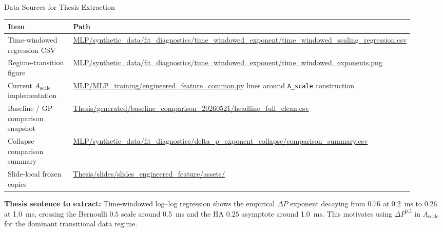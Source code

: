 \documentclass[UTF8,aspectratio=169]{ctexbeamer}
\begin{document}
\begin{frame}{Data Sources for Thesis Extraction}
\small
\begin{tabular}{L{0.28\linewidth}L{0.64\linewidth}}
\toprule
Item & Path \\
\midrule
Time-windowed regression CSV &
\scriptsize\url{MLP/synthetic_data/fit_diagnostics/time_windowed_exponent/time_windowed_scaling_regression.csv} \\
Regime-transition figure &
\scriptsize\url{MLP/synthetic_data/fit_diagnostics/time_windowed_exponent/time_windowed_exponents.png} \\
Current \(A_{\mathrm{scale}}\) implementation &
\scriptsize\url{MLP/MLP_training/engineered_feature_common.py} lines around \texttt{A\_scale} construction \\
Baseline / GP comparison snapshot &
\scriptsize\url{Thesis/generated/baseline_comparison_20260521/headline_full_clean.csv} \\
Collapse comparison summary &
\scriptsize\url{MLP/synthetic_data/fit_diagnostics/delta_p_exponent_collapse/comparison_summary.csv} \\
Slide-local frozen copies &
\scriptsize\url{Thesis/slides/slides_engineered_feature/assets/} \\
\bottomrule
\end{tabular}

\vspace{0.6em}
\textbf{Thesis sentence to extract:} Time-windowed log--log regression shows the empirical \(\Delta P\) exponent decaying from 0.76 at \SI{0.2}{ms} to 0.26 at \SI{1.0}{ms}, crossing the Bernoulli \(0.5\) scale around \SI{0.5}{ms} and the HA \(0.25\) asymptote around \SI{1.0}{ms}. This motivates using \(\Delta P^{0.5}\) in \(A_{\mathrm{scale}}\) for the dominant transitional data regime.
\end{frame}
\end{document}
